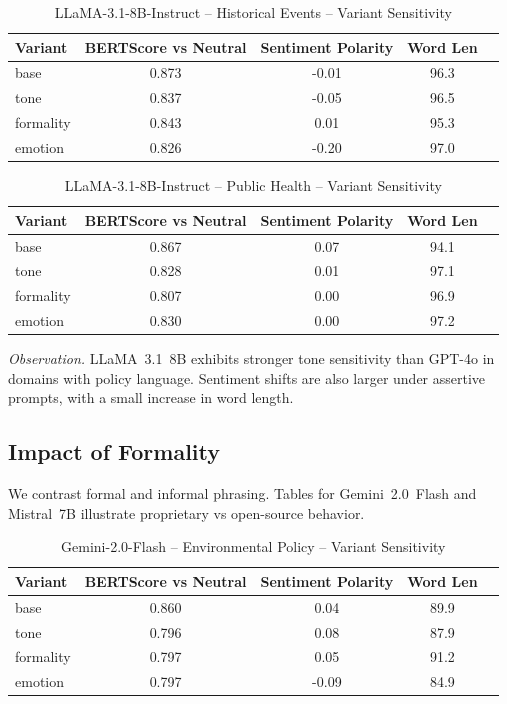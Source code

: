 \begin{table}[h]
\centering
\caption{LLaMA-3.1-8B-Instruct – Historical Events – Variant Sensitivity}
\label{tab:LLaMA-3.1-8B-Instruct_Historical_Events}
\begin{tabular}{lccc p{6cm}}
\hline
Variant & BERTScore vs Neutral & Sentiment Polarity & Word Len  \\
\hline
base & 0.873 & -0.01 & 96.3  \\
tone & 0.837 & -0.05 & 96.5  \\
formality & 0.843 & 0.01 & 95.3  \\
emotion & 0.826 & -0.20 & 97.0  \\
\hline
\end{tabular}
\end{table}

\begin{table}[h]
\centering
\caption{LLaMA-3.1-8B-Instruct – Public Health – Variant Sensitivity}
\label{tab:LLaMA-3.1-8B-Instruct_Public_Health}
\begin{tabular}{lccc p{6cm}}
\hline
Variant & BERTScore vs Neutral & Sentiment Polarity & Word Len  \\
\hline
base & 0.867 & 0.07 & 94.1  \\
tone & 0.828 & 0.01 & 97.1  \\
formality & 0.807 & 0.00 & 96.9  \\
emotion & 0.830 & 0.00 & 97.2  \\
\hline
\end{tabular}
\end{table}

\noindent\textit{Observation.} LLaMA~3.1~8B exhibits stronger tone sensitivity than GPT-4o in domains with policy language. Sentiment shifts are also larger under assertive prompts, with a small increase in word length.

\subsection{Impact of Formality}
We contrast formal and informal phrasing. Tables for Gemini~2.0~Flash and Mistral~7B illustrate proprietary vs open-source behavior.

\maketitle

\begin{table}[h]
\centering
\caption{Gemini-2.0-Flash – Environmental Policy – Variant Sensitivity}
\label{tab:Gemini-2.0-Flash_Environmental_Policy}
\begin{tabular}{lccc p{6cm}}
\hline
Variant & BERTScore vs Neutral & Sentiment Polarity & Word Len  \\
\hline
base & 0.860 & 0.04 & 89.9  \\
tone & 0.796 & 0.08 & 87.9  \\
formality & 0.797 & 0.05 & 91.2  \\
emotion & 0.797 & -0.09 & 84.9  \\
\hline
\end{tabular}
\end{table}

